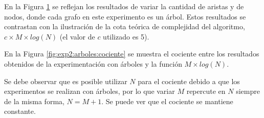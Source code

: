     \renewcommand\constante{5}

    En la Figura \ref{fig:exp2:arboles} se reflejan los resultados de variar la cantidad de aristas y de nodos, donde cada grafo en este experimento es un árbol. Estos resultados se contrastan con la ilustración de la cota teórica de complejidad del algoritmo, $c \times M \times log(N)$ (el valor de $c$ utilizado es \constante).

    \begin{figure}[H]
        \centering
        \caption{}
        \label{fig:exp2:arboles}
    \end{figure}

    En la Figura \ref{fig:exp2:arboles:cociente} se muestra el cociente entre los resultados obtenidos de la experimentación con árboles y la función $M \times log(N)$.

    Se debe observar que es posible utilizar $N$ para el cociente debido a que los experimentos se realizan con árboles, por lo que variar $M$ repercute en $N$ siempre de la misma forma, $N = M + 1$. Se puede ver que el cociente se mantiene constante.

